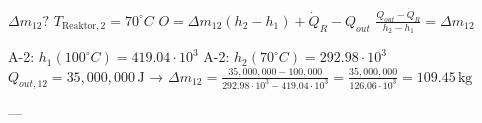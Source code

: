 \( \Delta m_{12}? \)  
\( T_{\text{Reaktor},2} = 70^\circ C \)  
\( O = \Delta m_{12} (h_{2} - h_{1}) + \dot{Q}_{R} - Q_{out} \)  
\( \frac{Q_{out} - \dot{Q}_{R}}{h_{2} - h_{1}} = \Delta m_{12} \)  

A-2: \( h_{1} (100^\circ C) = 419.04 \cdot 10^3 \)  
A-2: \( h_{2} (70^\circ C) = 292.98 \cdot 10^3 \)  
\( Q_{out,12} = 35,000,000 \, \text{J} \)  
→ \( \Delta m_{12} = \frac{35,000,000 - 100,000}{292.98 \cdot 10^3 - 419.04 \cdot 10^3} = \frac{35,000,000}{126.06 \cdot 10^3} = 109.45 \, \text{kg} \)  

---